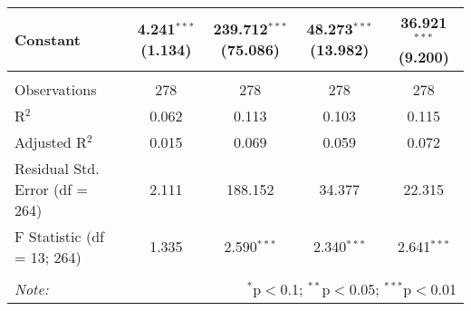 \begin{table}[H]
\begin{tabular}{@{\extracolsep{5pt}}lcccc}
  Constant & 4.241$^{***}$ (1.134) & 239.712$^{***}$ (75.086) & 48.273$^{***}$ (13.982) & 36.921$^{***}$ (9.200) \\ 
 \hline \\[-1.8ex] 
Observations & 278 & 278 & 278 & 278 \\ 
R$^{2}$ & 0.062 & 0.113 & 0.103 & 0.115 \\ 
Adjusted R$^{2}$ & 0.015 & 0.069 & 0.059 & 0.072 \\ 
Residual Std. Error (df = 264) & 2.111 & 188.152 & 34.377 & 22.315 \\ 
F Statistic (df = 13; 264) & 1.335 & 2.590$^{***}$ & 2.340$^{***}$ & 2.641$^{***}$ \\ 
\hline 
\hline \\[-1.8ex] 
\textit{Note:}  & \multicolumn{4}{r}{$^{*}$p$<$0.1; $^{**}$p$<$0.05; $^{***}$p$<$0.01} \\ 
\end{tabular} 
\end{table} 
